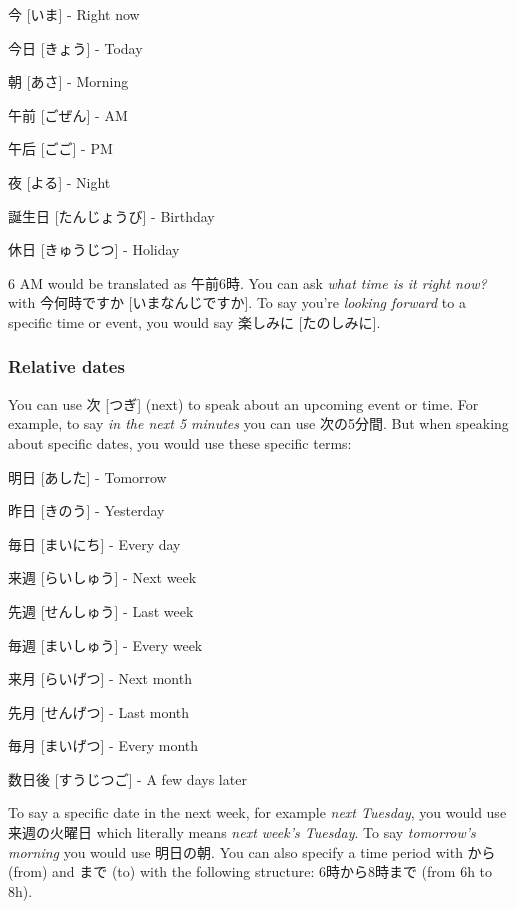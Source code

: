 \documentclass{article}
\begin{document}
\begin{CJK}{UTF8}{min}
\begin{multicols*}{3}
\begin{colorize}
\item 今 [いま] - Right now
\item 今日 [きょう] - Today
\item 朝 [あさ] - Morning
\item 午前 [ごぜん] - AM
\item 午后 [ごご] - PM
\item 夜 [よる] - Night
\item 誕生日 [たんじょうび] - Birthday
\item 休日 [きゅうじつ] - Holiday
\end{colorize}

6 AM would be translated as 午前6時. You can ask \textit{what time is it right now?} with 今何時ですか [いまなんじですか]. To say you're \textit{looking forward} to a specific time 
or event, you would say 楽しみに [たのしみに].

\subsubsection{Relative dates}

You can use 次 [つぎ] (next) to speak about an upcoming event or time. For example, to say \textit{in the next 5 minutes} you can use 次の5分間. But when speaking about specific 
dates, you would use these specific terms:

\begin{colorize}
\item 明日 [あした] - Tomorrow
\item 昨日 [きのう] - Yesterday
\item 毎日 [まいにち] - Every day
\item 来週 [らいしゅう] - Next week
\item 先週 [せんしゅう] - Last week
\item 毎週 [まいしゅう] - Every week
\item 来月 [らいげつ] - Next month
\item 先月 [せんげつ] - Last month
\item 毎月 [まいげつ] - Every month
\item 数日後 [すうじつご] - A few days later
\end{colorize}

To say a specific date in the next week, for example \textit{next Tuesday}, you would use 来週の火曜日 which literally means \textit{next week's Tuesday}. To say \textit{tomorrow's 
morning} you would use 明日の朝. You can also specify a time period with から (from) and まで (to) with the following structure: 6時から8時まで (from 6h to 8h).


\end{multicols*}
\end{CJK}
\end{document}
